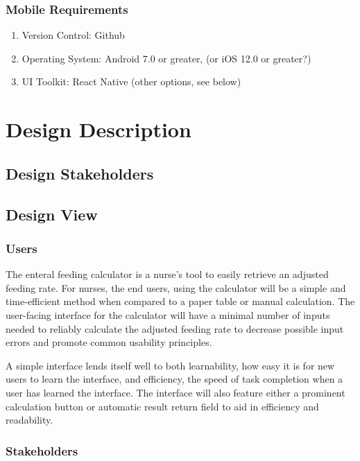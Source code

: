 \documentclass[onecolumn, draftclsnofoot,10pt, compsoc]{IEEEtran}
\begin{document}
\subsubsection{Mobile Requirements}
\begin{enumerate}
    \item Version Control: Github
    \item Operating System: Android 7.0 or greater, (or iOS 12.0 or greater?)
    \item UI Toolkit: React Native (other options, see below)
\end{enumerate}

\section{Design Description}
\subsection{Design Stakeholders}

\subsection{Design View}
\subsubsection{Users}
The enteral feeding calculator is a nurse's tool to easily retrieve an adjusted feeding rate.
For nurses, the end users, using the calculator will be a simple and time-efficient method when compared to a paper table or manual calculation.
The user-facing interface for the calculator will have a minimal number of inputs needed to reliably calculate the adjusted feeding rate to decrease possible input errors and promote common usability principles.

A simple interface lends itself well to both learnability, how easy it is for new users to learn the interface, and efficiency, the speed of task completion when a user has learned the interface.
The interface will also feature either a prominent calculation button or automatic result return field to aid in efficiency and readability.
\subsubsection{Stakeholders}%
\end{document}
